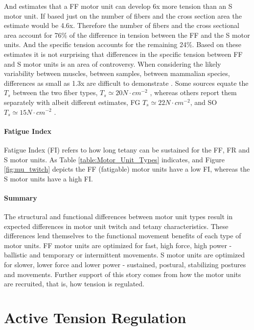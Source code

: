 And estimates that a FF motor unit can develop 6x more tension than an S motor unit. If based just on the number of fibers and the cross section area the estimate would be 4.6x. Therefore the number of fibers and the cross sectional area account for 76\% of the difference in tension between the FF and the S motor units. And the specific tension accounts for the remaining 24\%. Based on these estimates it is not surprising that differences in the specific tension between FF and S motor units is an area of controversy. When considering the likely variability between muscles, between samples, between mammalian species, differences as small as 1.3x are difficult to demonstrate \cite{lieber_skeletal_2010}. Some sources equate the $T_s$ between the two fiber types, $T_s \simeq 20 N \cdot cm^{-2}$ \cite{feher_quantitative_2017}, whereas others report them separately with albeit different estimates, FG $T_s \simeq 22 N \cdot cm^{-2}$, and SO $T_s \simeq 15 N \cdot cm^{-2}$ \cite{lieber_skeletal_2010}.

\paragraph{Fatigue Index}
Fatigue Index (FI) refers to how long tetany can be sustained for the FF, FR and S motor units. As Table \ref{table:Motor_Unit_Types} indicates, and Figure \ref{fig:mu_twitch} depicts the FF (fatigable) motor units have a low FI, whereas the S motor units have a high FI.

\paragraph{Summary}
The structural and functional differences between motor unit types result in expected differences in motor unit twitch and tetany characteristics. These differences lend themselves to the functional movement benefits of each type of motor units. FF motor units are optimized for fast, high force, high power - ballistic and temporary or intermittent movements. S motor units are optimized for slower, lower force and lower power - sustained, postural, stabilizing postures and movements. Further support of this story comes from how the motor units are recruited, that is, how tension is regulated.

\section{Active Tension Regulation}

